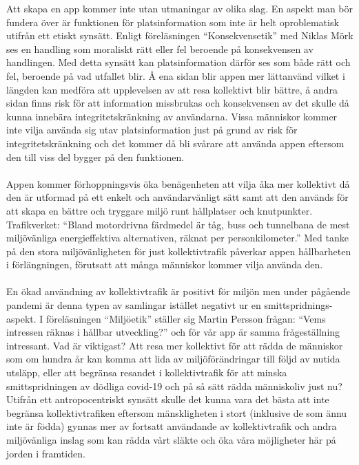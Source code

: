 \documentclass{article}
\begin{document}
Att skapa en app kommer inte utan utmaningar av olika slag. En aspekt man bör fundera över är funktionen för platsinformation som inte är helt oproblematisk utifrån ett etiskt synsätt. Enligt föreläsningen “Konsekvensetik” med Niklas Mörk ses en handling som moraliskt rätt eller fel beroende på konsekvensen av handlingen. Med detta synsätt kan platsinformation därför ses som både rätt och fel, beroende på vad utfallet blir. Å ena sidan blir appen mer lättanvänd vilket i längden kan medföra att upplevelsen av att resa kollektivt blir bättre, å andra sidan finns risk för att information missbrukas och konsekvensen av det skulle då kunna innebära integritetskränkning av användarna. Vissa människor kommer inte vilja använda sig utav platsinformation just på grund av risk för integritetskränkning och det kommer då bli svårare att använda appen eftersom den till viss del bygger på den funktionen. 
\\\\
Appen kommer förhoppningsvis öka benägenheten att vilja åka mer kollektivt då den är utformad på ett enkelt och användarvänligt sätt samt att den används för att skapa en bättre och tryggare miljö runt hållplatser och knutpunkter. Trafikverket: “Bland motordrivna färdmedel är tåg, buss och tunnelbana de mest miljövänliga energieffektiva alternativen, räknat per personkilometer.” Med tanke på den stora miljövänligheten för just kollektivtrafik påverkar appen hållbarheten i förlängningen, förutsatt att många människor kommer vilja använda den. 
\\\\
En ökad användning av kollektivtrafik är positivt för miljön men under pågående pandemi är denna typen av samlingar istället negativt ur en smittspridnings-aspekt. I föreläsningen “Miljöetik” ställer sig Martin Persson frågan: “Vems intressen räknas i hållbar utveckling?” och för vår app är samma frågeställning intressant. Vad är viktigast? Att resa mer kollektivt för att rädda de människor som om hundra år kan komma att lida av miljöförändringar till följd av nutida utsläpp, eller att begränsa resandet i kollektivtrafik för att minska smittspridningen av dödliga covid-19 och på så sätt rädda människoliv just nu? Utifrån ett antropocentriskt synsätt skulle det kunna vara det bästa att inte begränsa kollektivtrafiken eftersom mänskligheten i stort (inklusive de som ännu inte är födda) gynnas mer av fortsatt användande av kollektivtrafik och andra miljövänliga inslag som kan rädda vårt släkte och öka våra möjligheter här på jorden i framtiden. 
\\\\
\end{document}
